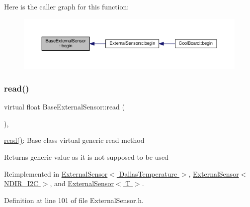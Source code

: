 Here is the caller graph for this function\+:\nopagebreak
\begin{figure}[H]
\begin{center}
\leavevmode
\includegraphics[width=350pt]{d1/d68/class_base_external_sensor_a87d132803d4f4fdd4e66332809f0c9a0_icgraph}
\end{center}
\end{figure}
\mbox{\label{class_base_external_sensor_a1564f16deacf57b51b9948ac29db4291}} 
\subsubsection{\texorpdfstring{read()}{read()}\hspace{0.1cm}{\footnotesize\ttfamily [1/2]}}
{\footnotesize\ttfamily virtual float Base\+External\+Sensor\+::read (\begin{DoxyParamCaption}{ }\end{DoxyParamCaption})\hspace{0.3cm}{\ttfamily [inline]}, {\ttfamily [virtual]}}

\hyperlink{class_base_external_sensor_a1564f16deacf57b51b9948ac29db4291}{read()}\+: Base class virtual generic read method

\begin{DoxyReturn}{Returns}
generic value as it is not supposed to be used 
\end{DoxyReturn}


Reimplemented in \hyperlink{class_external_sensor_3_01_dallas_temperature_01_4_a1e725d9338314515d4e5dc456ed6a6c8}{External\+Sensor$<$ Dallas\+Temperature $>$}, \hyperlink{class_external_sensor_3_01_n_d_i_r___i2_c_01_4_a239d18652e9fb4673842ae9726edf44f}{External\+Sensor$<$ N\+D\+I\+R\+\_\+\+I2\+C $>$}, and \hyperlink{class_external_sensor_a5fb3afc7d244fb86dac68ab5481bc407}{External\+Sensor$<$ T $>$}.



Definition at line 101 of file External\+Sensor.\+h.



